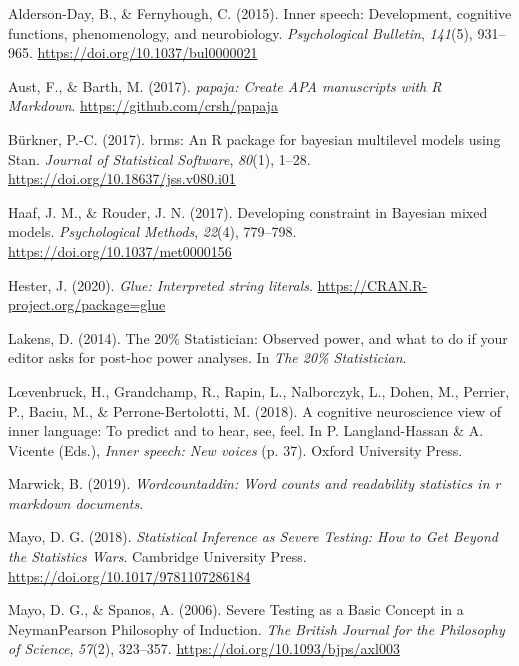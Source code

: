 \documentclass[
  english,
  man,floatsintext]{apa6}
\newlength{\cslhangindent}
\newenvironment{cslreferences}%
  {\setlength{\parindent}{0pt}%
  \everypar{\setlength{\hangindent}{\cslhangindent}}\ignorespaces}%
  {\par}
\begin{document}
\hypertarget{refs}{}
\begin{cslreferences}
\leavevmode\hypertarget{ref-alderson-day_inner_2015}{}%
Alderson-Day, B., \& Fernyhough, C. (2015). Inner speech: Development, cognitive functions, phenomenology, and neurobiology. \emph{Psychological Bulletin}, \emph{141}(5), 931--965. \url{https://doi.org/10.1037/bul0000021}

\leavevmode\hypertarget{ref-R-papaja}{}%
Aust, F., \& Barth, M. (2017). \emph{papaja: Create APA manuscripts with R Markdown}. \url{https://github.com/crsh/papaja}

\leavevmode\hypertarget{ref-R-brms}{}%
Bürkner, P.-C. (2017). brms: An R package for bayesian multilevel models using Stan. \emph{Journal of Statistical Software}, \emph{80}(1), 1--28. \url{https://doi.org/10.18637/jss.v080.i01}

\leavevmode\hypertarget{ref-haaf_developing_2017}{}%
Haaf, J. M., \& Rouder, J. N. (2017). Developing constraint in Bayesian mixed models. \emph{Psychological Methods}, \emph{22}(4), 779--798. \url{https://doi.org/10.1037/met0000156}

\leavevmode\hypertarget{ref-R-glue}{}%
Hester, J. (2020). \emph{Glue: Interpreted string literals}. \url{https://CRAN.R-project.org/package=glue}

\leavevmode\hypertarget{ref-lakens_20_2014}{}%
Lakens, D. (2014). The 20\% Statistician: Observed power, and what to do if your editor asks for post-hoc power analyses. In \emph{The 20\% Statistician}.

\leavevmode\hypertarget{ref-loevenbruck_cognitive_2018}{}%
Lœvenbruck, H., Grandchamp, R., Rapin, L., Nalborczyk, L., Dohen, M., Perrier, P., Baciu, M., \& Perrone-Bertolotti, M. (2018). A cognitive neuroscience view of inner language: To predict and to hear, see, feel. In P. Langland-Hassan \& A. Vicente (Eds.), \emph{Inner speech: New voices} (p. 37). Oxford University Press.

\leavevmode\hypertarget{ref-R-wordcountaddin}{}%
Marwick, B. (2019). \emph{Wordcountaddin: Word counts and readability statistics in r markdown documents}.

\leavevmode\hypertarget{ref-mayo_statistical_2018}{}%
Mayo, D. G. (2018). \emph{Statistical Inference as Severe Testing: How to Get Beyond the Statistics Wars}. Cambridge University Press. \url{https://doi.org/10.1017/9781107286184}

\leavevmode\hypertarget{ref-mayo_severe_2006}{}%
Mayo, D. G., \& Spanos, A. (2006). Severe Testing as a Basic Concept in a NeymanPearson Philosophy of Induction. \emph{The British Journal for the Philosophy of Science}, \emph{57}(2), 323--357. \url{https://doi.org/10.1093/bjps/axl003}


\end{cslreferences}
\end{document}
